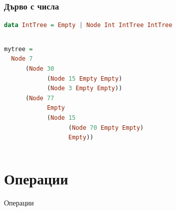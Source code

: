\documentclass{beamer}
\begin{document}
\begin{frame}[fragile]
\frametitle{Дърво с числа}


    \begin{lstlisting}[basicstyle=\small,language=Haskell]
data IntTree = Empty | Node Int IntTree IntTree
    \end{lstlisting}

    
    \begin{columns}[t]
      \begin{column}{0.3\textwidth}

        \begin{lstlisting}[basicstyle=\tiny,language=Haskell]
mytree = 
  Node 7
      (Node 30 
            (Node 15 Empty Empty)
            (Node 3 Empty Empty))
      (Node 77
            Empty
            (Node 15
                  (Node 70 Empty Empty)
                  Empty))
        \end{lstlisting}
              
      \end{column}
      \begin{column}{0.7\textwidth}
        \begin{figure}
          \centering
        \end{figure}    
        
      \end{column}
    \end{columns}
    
    


\end{frame}


\section{Операции}
\begin{frame}
\centerline{Операции}
\end{frame}
\end{document}
